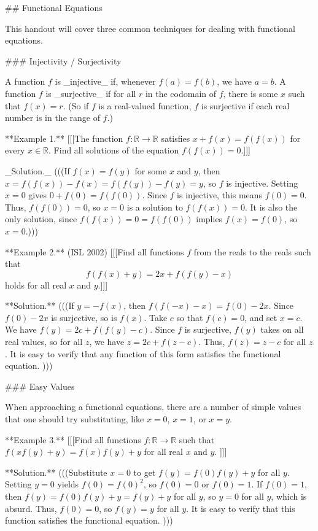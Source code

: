 ## Functional Equations

This handout will cover three common techniques for dealing with functional equations. 


### Injectivity / Surjectivity

A function $f$ is _injective_ if, whenever $f(a) = f(b)$, we have $a = b$. A function $f$ is _surjective_ if for all $r$ in the codomain of $f$, there is some $x$ such that $f(x) = r$. (So if $f$ is a real-valued function, $f$ is surjective if each real number is in the range of $f$.)

**Example 1.** [[[The function $f : \mathbb{R} \to \mathbb{R}$ satisfies $x + f(x) = f(f(x))$ for every $x \in \mathbb{R}$. Find all solutions of the equation $f(f(x)) = 0$.]]]

_Solution._ (((If $f(x) = f(y)$ for some $x$ and $y$, then $x = f(f(x)) - f(x) = f(f(y)) - f(y) = y$, so $f$ is injective. Setting $x = 0$ gives $0 + f(0) = f(f(0))$. Since $f$ is injective, this means $f(0) = 0$. Thus, $f(f(0)) = 0$, so $x = 0$ is a solution to $f(f(x)) = 0$. It is also the only solution, since $f(f(x)) = 0 = f(f(0))$ implies $f(x) = f(0)$, so $x = 0$.)))

**Example 2.** (ISL 2002) [[[Find all functions $f$ from the reals to the reals such that 
  \[ f(f(x) + y) = 2x + f(f(y) - x) \]
  holds for all real $x$ and $y$.]]]

**Solution.** (((If $y = -f(x)$, then $f(f(-x) - x) = f(0) - 2x$. Since $f(0) - 2x$ is surjective, so is $f(x)$. Take $c$ so that $f(c) = 0$, and set $x = c$. We have $f(y) = 2c + f(f(y) - c)$. Since $f$ is surjective, $f(y)$ takes on all real values, so for all $z$, we have $z = 2c + f(z - c)$. Thus, $f(z) = z - c$ for all $z$. It is easy to verify that any function of this form satisfies the functional equation. )))

### Easy Values

When approaching a functional equations, there are a number of simple values that one should try substituting, like $x = 0$, $x = 1$, or $x = y$.

**Example 3.** [[[Find all functions $f : \mathbb{R} \to \mathbb{R}$ such that $f(xf(y)+y) = f(x)f(y) + y$ for all real $x$ and $y$. ]]]

**Solution.** (((Substitute $x = 0$ to get $f(y) = f(0)f(y) + y$ for all $y$. Setting $y = 0$ yields $f(0) = f(0)^2$, so $f(0) = 0$ or $f(0) = 1$. If $f(0) = 1$, then $f(y) = f(0)f(y) + y = f(y) + y$ for all $y$, so $y = 0$ for all $y$, which is absurd. Thus, $f(0) = 0$, so $f(y) = y$ for all $y$. It is easy to verify that this function satisfies the functional equation. )))

